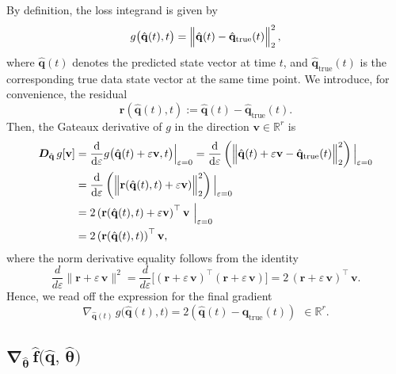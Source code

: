 By definition, the loss integrand is given by\\
$$g\bigl(\hat{\mathbf{q}}(t),t\bigr)= \Bigl\|\hat{\mathbf{q}}(t) - \hat{\mathbf{q}}_{\mathrm{true}}(t)\Bigr\|_2^2\,,$$
where $\hat{\mathbf{q}}(t)$ denotes the predicted state vector at time $t$, and $\hat{\mathbf{q}}_{\text{true}}(t)$ is the corresponding true data state vector at the same time point.
We introduce, for convenience, the residual\\
$$\mathbf{r}(\hat{\mathbf{q}}(t),t):=  \hat{\mathbf{q}}(t) - \hat{\mathbf{q}}_{\mathrm{true}}(t).$$
Then, the Gateaux derivative of $g$ in the direction $\mathbf{v}\in\mathbb{R}^r$ is\\
\begin{align*}
\label{eq:gradient_3}
\bm{D}_{\hat{\mathbf{q}}}\,g[\mathbf{v}]
&=\frac{\mathrm{d}}{\mathrm{d}\varepsilon}
g\bigl(\hat{\mathbf{q}}(t)+\varepsilon\mathbf{v},t\bigr)\Big|_{\varepsilon=0}=
\frac{\mathrm{d}}{\mathrm{d}\varepsilon}\left( \Bigl\|\hat{\mathbf{q}}(t) + \varepsilon\mathbf{v} - \hat{\mathbf{q}}_{\mathrm{true}}(t)\Bigr\|_2^2\right) \Big|_{\varepsilon=0}\\
 &= \frac{\mathrm{d}}{\mathrm{d}\varepsilon}\left( \Bigl\|\mathbf{r}(\hat{\mathbf{q}}(t),t) + \varepsilon\mathbf{v})\Bigr\|_2^2\right) \Big|_{\varepsilon=0}\\
 &= 2\left(\mathbf{r}(\hat{\mathbf{q}}(t),t) + \varepsilon\mathbf{v}\right)^{\top}\mathbf{v}~ \Big|_{\varepsilon=0}\\
 &= 2\left(\mathbf{r}(\hat{\mathbf{q}}(t),t)\right)^{\top}\mathbf{v},
\end{align*}
where the norm derivative equality follows from the identity\\
$$\frac{d}{d\varepsilon}\|\mathbf{r} + \varepsilon\,\mathbf{v}\|^2
= \frac{d}{d\varepsilon}\bigl[(\mathbf{r} + \varepsilon\,\mathbf{v})^\top (\mathbf{r} + \varepsilon\,\mathbf{v})\bigr]= 2\,(\mathbf{r} + \varepsilon\,\mathbf{v})^\top\,\mathbf{v}.$$
Hence, we read off the expression for the final gradient\\
\begin{equation}
\label{eq:gradient_3}
\nabla_{\hat{\mathbf{q}}(t)}\,g\bigl(\hat{\mathbf{q}}(t),t\bigr) = 2\left(\hat{\mathbf{q}}(t) - \hat{\mathbf{q}}_{\mathrm{true}}(t)\right)~~\in\mathbb{R}^r.
\end{equation}

\subsection{$\bm{\nabla}_{\hat{\bm{\theta}}}\,\hat{\mathbf{f}}\bigl(\hat{\mathbf{q}},\,\hat{\bm{\theta}}\bigr)$}

